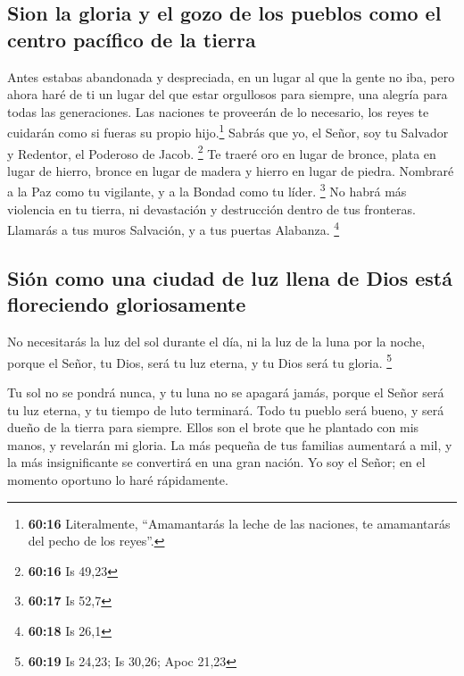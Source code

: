\hypertarget{sion-la-gloria-y-el-gozo-de-los-pueblos-como-el-centro-pacuxedfico-de-la-tierra}{%
\subsection{Sion la gloria y el gozo de los pueblos como el centro
pacífico de la
tierra}\label{sion-la-gloria-y-el-gozo-de-los-pueblos-como-el-centro-pacuxedfico-de-la-tierra}}

 Antes estabas abandonada y despreciada, en un lugar al
que la gente no iba, pero ahora haré de ti un lugar del que estar
orgullosos para siempre, una alegría para todas las generaciones.
 Las naciones te proveerán de lo necesario, los reyes te
cuidarán como si fueras su propio hijo.\footnote{\textbf{60:16}
  Literalmente, ``Amamantarás la leche de las naciones, te amamantarás
  del pecho de los reyes''.} Sabrás que yo, el Señor, soy tu Salvador y
Redentor, el Poderoso de Jacob. \footnote{\textbf{60:16} Is 49,23}
 Te traeré oro en lugar de bronce, plata en lugar de
hierro, bronce en lugar de madera y hierro en lugar de piedra. Nombraré
a la Paz como tu vigilante, y a la Bondad como tu líder. \footnote{\textbf{60:17}
  Is 52,7}  No habrá más violencia en tu tierra, ni
devastación y destrucción dentro de tus fronteras. Llamarás a tus muros
Salvación, y a tus puertas Alabanza. \footnote{\textbf{60:18} Is 26,1}

\hypertarget{siuxf3n-como-una-ciudad-de-luz-llena-de-dios-estuxe1-floreciendo-gloriosamente}{%
\subsection{Sión como una ciudad de luz llena de Dios está floreciendo
gloriosamente}\label{siuxf3n-como-una-ciudad-de-luz-llena-de-dios-estuxe1-floreciendo-gloriosamente}}

 No necesitarás la luz del sol durante el día, ni la luz
de la luna por la noche, porque el Señor, tu Dios, será tu luz eterna, y
tu Dios será tu gloria. \footnote{\textbf{60:19} Is 24,23; Is 30,26;
  Apoc 21,23}

 Tu sol no se pondrá nunca, y tu luna no se apagará
jamás, porque el Señor será tu luz eterna, y tu tiempo de luto
terminará.  Todo tu pueblo será bueno, y será dueño de la
tierra para siempre. Ellos son el brote que he plantado con mis manos, y
revelarán mi gloria.  La más pequeña de tus familias
aumentará a mil, y la más insignificante se convertirá en una gran
nación. Yo soy el Señor; en el momento oportuno lo haré rápidamente.

